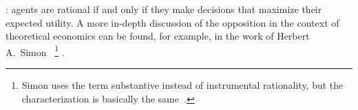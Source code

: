 \documentclass[a4paper]{article}
\begin{document}
: agents are rational if and only if they make decisions that maximize their expected utility.
A more in-depth discussion of the opposition in the context of theoretical economics can be found, for example, in the work of Herbert A.~Simon~\parencite*[\emph{e.g.}][]{simon_rationality_1986}%
\footnote{Simon uses the term substantive instead of instrumental rationality, but the characterization is basically the same~\parencite[210-212]{simon_rationality_1986}.}%
.
\end{document}
